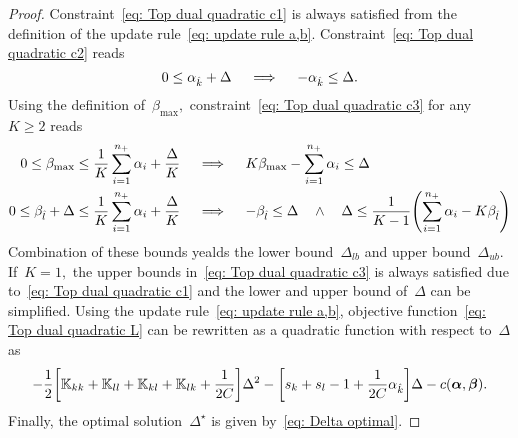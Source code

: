 \begin{proof}
  Constraint~\eqref{eq: Top dual quadratic c1} is always satisfied from the definition of the update rule~\eqref{eq: update rule a,b}. Constraint~\eqref{eq: Top dual quadratic c2} reads
  \begin{equation*}
    0 \leq \alpha_{\hat{k}} + \Delta
    \quad \implies \quad
    - \alpha_{\hat{k}} \leq \Delta.
  \end{equation*}
  Using the definition of~$\beta_{\max},$ constraint~\eqref{eq: Top dual quadratic c3} for any~$K \geq 2$ reads
  \begin{align*}
    0 \leq \beta_{\max} \leq \frac{1}{K} \sum_{i = 1}^{\npos} \alpha_i + \frac{\Delta}{K} 
    & \quad \implies \quad
    K\beta_{\max} - \sum_{i = 1}^{\npos} \alpha_i \leq \Delta \\
    0 \leq \betal + \Delta \leq \frac{1}{K} \sum_{i = 1}^{\npos} \alpha_i + \frac{\Delta}{K}
    & \quad \implies \quad
    -\betal \leq \Delta \quad \land \quad \Delta \leq \frac{1}{K-1}\Brac{\sum_{i = 1}^{\npos} \alpha_i - K \betal}
  \end{align*}
  Combination of these bounds yealds the lower bound~$\Delta_{lb}$ and upper bound~$\Delta_{ub}.$ If~$K = 1,$ the upper bounds in~\eqref{eq: Top dual quadratic c3} is always satisfied due to~\eqref{eq: Top dual quadratic c1} and the lower and upper bound of~$\Delta$ can be simplified. Using the update rule~\eqref{eq: update rule a,b}, objective function~\eqref{eq: Top dual quadratic L} can be rewritten as a quadratic function with respect to~$\Delta$ as
  \begin{equation*}
    - \frac{1}{2} \Brac[s]{\K_{kk} + \K_{ll} + \K_{kl} + \K_{lk} + \frac{1}{2C}} \Delta^2
    - \Brac[s]{s_k + s_l - 1 + \frac{1}{2C} \alphak} \Delta
    - c(\bm{\alpha}, \bm{\beta}).
  \end{equation*}
  Finally, the optimal solution~$\Delta^{\star}$ is given by~\eqref{eq: Delta optimal}.
\end{proof}


